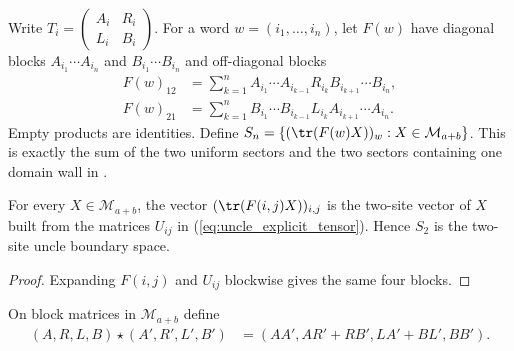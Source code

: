 \begin{definition}
    \label{def:uncle_boundary_space}
    \leanok
    Write $T_i=\left(\begin{smallmatrix}A_i&R_i\\L_i&B_i\end{smallmatrix}\right)$.
    For a word $w=(i_1,\ldots,i_n)$, let $F(w)$ have diagonal blocks
    $A_{i_1}\cdots A_{i_n}$ and $B_{i_1}\cdots B_{i_n}$ and off-diagonal blocks
    \begin{align}
        F(w)_{12} & =\sum_{k=1}^n A_{i_1}\cdots A_{i_{k-1}}R_{i_k}B_{i_{k+1}}\cdots B_{i_n}, \\
        F(w)_{21} & =\sum_{k=1}^n B_{i_1}\cdots B_{i_{k-1}}L_{i_k}A_{i_{k+1}}\cdots A_{i_n}.
    \end{align}
    Empty products are identities. Define
    $S_n=\{(\tr(F(w)X))_w:X\in\mathcal M_{a+b}\}$.
    This is exactly the sum of the two uniform sectors and the two sectors
    containing one domain wall in
    \cite[equation defining $S_n$, Appendix intersection proof]{FernandezGonzalez2015Uncle}.
\end{definition}

\begin{lemma}
    \label{lem:uncle_boundary_length_two}
    \leanok
    For every $X\in\mathcal M_{a+b}$, the vector $(\tr(F(i,j)X))_{i,j}$ is
    the two-site vector of $X$ built from the matrices $U_{ij}$ in
    (\ref{eq:uncle_explicit_tensor}). Hence $S_2$ is the two-site uncle
    boundary space.
\end{lemma}
\begin{proof}
    \leanok
    Expanding $F(i,j)$ and $U_{ij}$ blockwise gives the same four blocks.
\end{proof}

\begin{definition}
    \label{def:uncle_boundary_product}
    \leanok
    On block matrices in $\mathcal M_{a+b}$ define
    \begin{align}
        (A,R,L,B)\star(A',R',L',B')
         & =(AA',AR'+RB',LA'+BL',BB').
    \end{align}
\end{definition}

